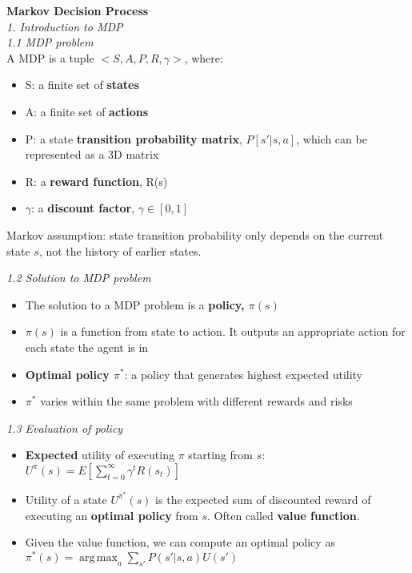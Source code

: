 \documentclass[12pt]{article}
\begin{document}
\noindent
{\large{ \textbf{Markov Decision Process} }}\\

\noindent
\textsl{1. Introduction to MDP}\\

\noindent
\textsl{1.1 MDP problem}\\

\noindent
A MDP is a tuple $<S, A, P, R, \gamma >$,  where: 
\begin{itemize}
\item S: a finite set of \textbf{states}
\item A: a finite set of \textbf{actions} 
\item P: a state \textbf{transition probability matrix}, $P[s' | s, a]$, which can be represented as a 3D matrix
\item R: a \textbf{reward function}, R(s)
\item $\gamma$: a \textbf{discount factor}, $\gamma \in [0, 1]$ 
\end{itemize}
\begin{tcolorbox}
Markov assumption: state transition probability only depends on the current state $s$, not the history of earlier states.
\end{tcolorbox}

\noindent
\textsl{1.2 Solution to MDP problem}
\begin{itemize}
\item The solution to a MDP problem is a \textbf{policy, $\pi(s)$}
\item $\pi(s)$ is a function from state to action. It outputs an appropriate action for each state the agent is in
\item \textbf{Optimal policy $\pi^*$}: a policy that generates highest expected utility
\item $\pi^*$ varies within the same problem with different rewards and risks
\end{itemize}

\noindent
\textsl{1.3 Evaluation of policy}
\begin{itemize}
\item \textbf{Expected} utility of executing $\pi$ starting from $s$: $U^\pi(s) = E[\sum_{t = 0}^{\infty} \gamma^t R(s_t)]$
\item Utility of a state $U^{\pi^*}(s)$ is the expected sum of discounted reward of executing an \textbf{optimal policy} from $s$. Often called \textbf{value function}.
\item Given the value function, we can compute an optimal policy as  \\
$\pi^*(s) = \operatorname*{arg\,max}_{a}{\sum_{s'}^{} P(s' | s, a) U(s') }$
\end{itemize}
\end{document}
